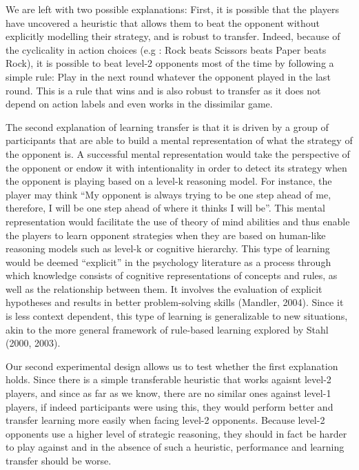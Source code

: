 \documentclass[man,floatsintext]{apa6}
\begin{document}
We are left with two possible explanations: First, it is possible that the players have uncovered a heuristic that allows them to beat the opponent without explicitly modelling their strategy, and is robust to transfer. Indeed, because of the cyclicality in action choices (e.g : Rock beats Scissors beats Paper beats Rock), it is possible to beat level-2 opponents most of the time by following a simple rule: Play in the next round whatever the opponent played in the last round. This is a rule that wins and is also robust to transfer as it does not depend on action labels and even works in the dissimilar game.

The second explanation of learning transfer is that it is driven by a group of participants that are able to build a mental representation of what the strategy of the opponent is. A successful mental representation would take the perspective of the opponent or endow it with intentionality in order to detect its strategy when the opponent is playing based on a level-k reasoning model. For instance, the player may think ``My opponent is always trying to be one step ahead of me, therefore, I will be one step ahead of where it thinks I will be''. This mental representation would facilitate the use of theory of mind abilities and thus enable the players to learn opponent strategies when they are based on human-like reasoning models such as level-k or cognitive hierarchy. This type of learning would be deemed ``explicit'' in the psychology literature as a process through which knowledge consists of cognitive representations of concepts and rules, as well as the relationship between them. It involves the evaluation of explicit hypotheses and results in better problem-solving skills (Mandler, 2004). Since it is less context dependent, this type of learning is generalizable to new situations, akin to the more general framework of rule-based learning explored by Stahl (2000, 2003).

Our second experimental design allows us to test whether the first explanation holds. Since there is a simple transferable heuristic that works agaisnt level-2 players, and since as far as we know, there are no similar ones against level-1 players, if indeed participants were using this, they would perform better and transfer learning more easily when facing level-2 opponents. Because level-2 opponents use a higher level of strategic reasoning, they should in fact be harder to play against and in the absence of such a heuristic, performance and learning transfer should be worse.
\end{document}

